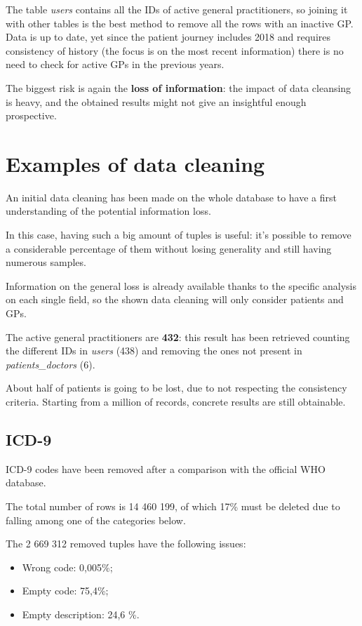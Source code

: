 The table \textit{users} contains all the IDs of active general practitioners, so joining it with other tables is the best method to remove all the rows with an inactive GP. Data is up to date, yet since the patient journey includes 2018 and requires consistency of history (the focus is on the most recent information) there is no need to check for active GPs in the previous years.

The biggest risk is again the \textbf{loss of information}: the impact of data cleansing is heavy, and the obtained results might not give an insightful enough prospective.

\section{Examples of data cleaning}
An initial data cleaning has been made on the whole database to have a first understanding of the potential information loss.

In this case, having such a big amount of tuples is useful: it's possible to remove a considerable percentage of them without losing generality and still having numerous samples.

Information on the general loss is already available thanks to the specific analysis on each single field, so the shown data cleaning will only consider patients and GPs.

The active general practitioners are \textbf{432}: this result has been retrieved counting the different IDs in \textit{users} (438) and removing the ones not present in \textit{patients\_doctors} (6).

About half of patients is going to be lost, due to not respecting the consistency criteria. Starting from a million of records, concrete results are still obtainable.

\subsection{ICD-9}
ICD-9 codes have been removed after a comparison with the official WHO database.

The total number of rows is 14 460 199, of which 17\% must be deleted due to falling among one of the categories below.

The 2 669 312 removed tuples have the following issues:
\begin{itemize}
	\item Wrong code: 0,005\%;
	\item Empty code: 75,4\%;
	\item Empty description: 24,6 \%.
\end{itemize}

